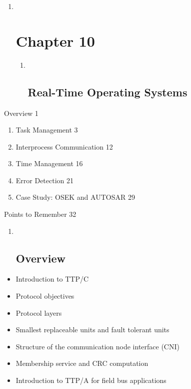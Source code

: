 \begin{enumerate}
\item ~
  \section{Chapter 10}\label{chapter-10}

  \begin{enumerate}
  \item ~
    \subsection{Real-Time Operating
    Systems}\label{real-time-operating-systems}
  \end{enumerate}
\end{enumerate}

Overview 1

\begin{enumerate}
\def\labelenumi{\arabic{enumi}.}
\item
  Task Management 3
\item
  Interprocess Communication 12
\item
  Time Management 16
\item
  Error Detection 21
\item
  Case Study: OSEK and AUTOSAR 29
\end{enumerate}

Points to Remember 32

\begin{enumerate}
\item ~
  \subsection{}\label{section}

  \subsection{Overview}\label{overview}
\end{enumerate}

\begin{itemize}
\item
  Introduction to TTP/C
\item
  Protocol objectives
\item
  Protocol layers
\item
  Smallest replaceable units and fault tolerant units
\item
  Structure of the communication node interface (CNI)
\item
  Membership service and CRC computation
\item
  Introduction to TTP/A for field bus applications
\end{itemize}

